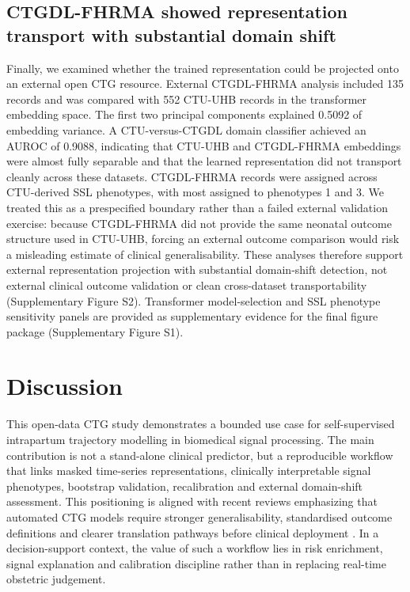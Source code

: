 \documentclass[utf8]{FrontiersinHarvard}
\begin{document}
\subsection{CTGDL-FHRMA showed representation transport with substantial domain shift}

Finally, we examined whether the trained representation could be projected onto an external open CTG resource. External CTGDL-FHRMA analysis included 135 records and was compared with 552 CTU-UHB records in the transformer embedding space. The first two principal components explained 0.5092 of embedding variance. A CTU-versus-CTGDL domain classifier achieved an AUROC of 0.9088, indicating that CTU-UHB and CTGDL-FHRMA embeddings were almost fully separable and that the learned representation did not transport cleanly across these datasets. CTGDL-FHRMA records were assigned across CTU-derived SSL phenotypes, with most assigned to phenotypes 1 and 3. We treated this as a prespecified boundary rather than a failed external validation exercise: because CTGDL-FHRMA did not provide the same neonatal outcome structure used in CTU-UHB, forcing an external outcome comparison would risk a misleading estimate of clinical generalisability. These analyses therefore support external representation projection with substantial domain-shift detection, not external clinical outcome validation or clean cross-dataset transportability (Supplementary Figure S2). Transformer model-selection and SSL phenotype sensitivity panels are provided as supplementary evidence for the final figure package (Supplementary Figure S1).

\section{Discussion}

This open-data CTG study demonstrates a bounded use case for self-supervised intrapartum trajectory modelling in biomedical signal processing. The main contribution is not a stand-alone clinical predictor, but a reproducible workflow that links masked time-series representations, clinically interpretable signal phenotypes, bootstrap validation, recalibration and external domain-shift assessment. This positioning is aligned with recent reviews emphasizing that automated CTG models require stronger generalisability, standardised outcome definitions and clearer translation pathways before clinical deployment \citep{mendis2023,francis2024}. In a decision-support context, the value of such a workflow lies in risk enrichment, signal explanation and calibration discipline rather than in replacing real-time obstetric judgement.
\end{document}
